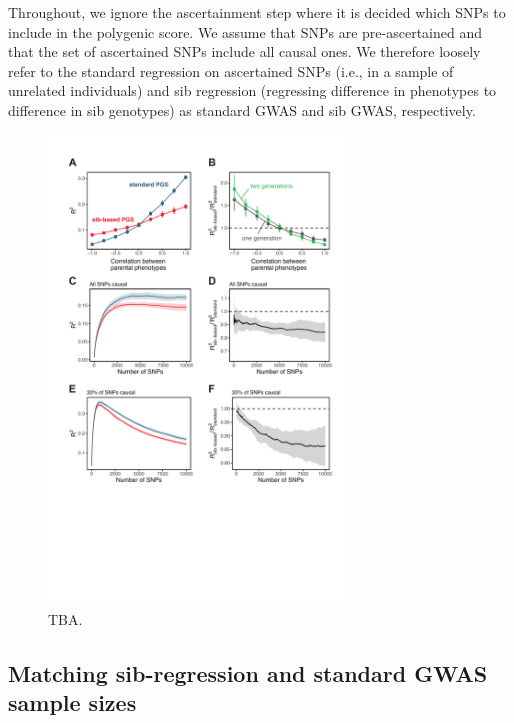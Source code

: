 \documentclass[hidelinks, 12pt]{article}
\begin{document}
Throughout, we ignore the ascertainment step where it is decided which SNPs to include in the polygenic score. We assume that SNPs are pre-ascertained and that the set of ascertained SNPs include all causal ones.  We therefore loosely refer to the standard regression on ascertained SNPs (i.e., in a sample of unrelated individuals) and sib regression (regressing difference in phenotypes to difference in sib genotypes) as standard GWAS and sib GWAS, respectively. 
\pagebreak

\begin{figure}[!th]
\centering
\includegraphics[width=0.7\textwidth]{supp_figures/assort_mate.pdf}
\caption[Prediction accuracy in sib and standard GWAS in the presence of assortative mating.]{\small TBA.}
\label{fig_assort_mate}
\end{figure}

\pagebreak

\subsection{Matching sib-regression and standard GWAS sample sizes}
\label{matching_errors_under_the_null}
\end{document}
